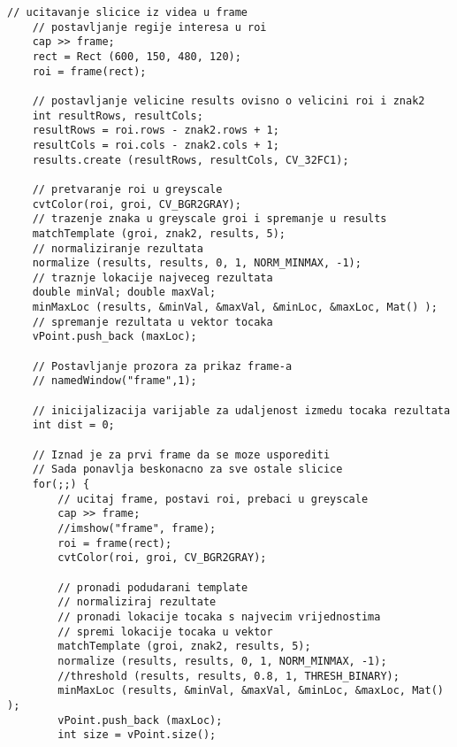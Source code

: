 \begin{lstlisting}[caption={}]
    // ucitavanje slicice iz videa u frame
    // postavljanje regije interesa u roi
    cap >> frame;
    rect = Rect (600, 150, 480, 120);
    roi = frame(rect);
    
    // postavljanje velicine results ovisno o velicini roi i znak2
    int resultRows, resultCols;
    resultRows = roi.rows - znak2.rows + 1;
    resultCols = roi.cols - znak2.cols + 1;
    results.create (resultRows, resultCols, CV_32FC1);

    // pretvaranje roi u greyscale
    cvtColor(roi, groi, CV_BGR2GRAY);      
    // trazenje znaka u greyscale groi i spremanje u results
    matchTemplate (groi, znak2, results, 5);
    // normaliziranje rezultata
    normalize (results, results, 0, 1, NORM_MINMAX, -1);
    // traznje lokacije najveceg rezultata
    double minVal; double maxVal;
    minMaxLoc (results, &minVal, &maxVal, &minLoc, &maxLoc, Mat() );
    // spremanje rezultata u vektor tocaka
    vPoint.push_back (maxLoc);
    
    // Postavljanje prozora za prikaz frame-a
    // namedWindow("frame",1);
    
    // inicijalizacija varijable za udaljenost izmedu tocaka rezultata
    int dist = 0;
    
    // Iznad je za prvi frame da se moze usporediti
    // Sada ponavlja beskonacno za sve ostale slicice
    for(;;) {        
        // ucitaj frame, postavi roi, prebaci u greyscale
        cap >> frame;              
        //imshow("frame", frame);
        roi = frame(rect);
        cvtColor(roi, groi, CV_BGR2GRAY);
        
        // pronadi podudarani template
        // normaliziraj rezultate
        // pronadi lokacije tocaka s najvecim vrijednostima
        // spremi lokacije tocaka u vektor
        matchTemplate (groi, znak2, results, 5);
        normalize (results, results, 0, 1, NORM_MINMAX, -1);
        //threshold (results, results, 0.8, 1, THRESH_BINARY);
        minMaxLoc (results, &minVal, &maxVal, &minLoc, &maxLoc, Mat() );
        vPoint.push_back (maxLoc);
        int size = vPoint.size();
        

\end{lstlisting}
